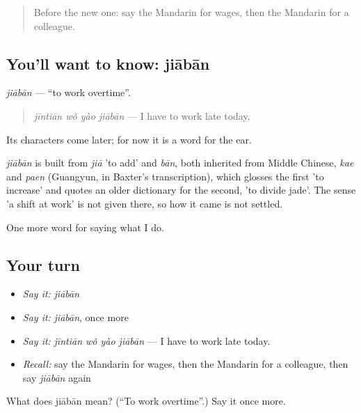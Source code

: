 \label{lesson:ZH-C255-jiaban}



\begin{quote}
Before the new one: say the Mandarin for wages, then the Mandarin for a colleague.
\end{quote}

\subsection*{You'll want to know: jiābān}
\emph{jiābān} — \textquotedblleft{}to work overtime\textquotedblright{}.

\begin{quote}
\emph{jīntiān wǒ yào jiābān} — I have to work late today.
\end{quote}

Its characters come later; for now it is a word for the ear.

\begin{cousinweb}
\emph{jiābān} is built from \emph{jiā} 'to add' and \emph{bān}, both inherited from Middle Chinese, \emph{kae} and \emph{paen} (Guangyun, in Baxter's transcription), which glosses the first 'to increase' and quotes an older dictionary for the second, 'to divide jade'. The sense 'a shift at work' is not given there, so how it came is not settled.
\end{cousinweb}

\begin{grammarlens}[title={What you've built}]
One more word for saying what I do.
\end{grammarlens}

\subsection*{Your turn}
\begin{itemize}
\raggedright
  \item \emph{Say it:} \emph{jiābān}
  \item \emph{Say it:} \emph{jiābān}, once more
  \item \emph{Say it:} \emph{jīntiān wǒ yào jiābān} — I have to work late today.
  \item \emph{Recall:} say the Mandarin for wages, then the Mandarin for a colleague, then say \emph{jiābān} again
\end{itemize}

\begin{tcolorbox}[breakable,colback=teal!4,colframe=teal!35!black,title={Before you move on}]
What does jiābān mean? (\textquotedblleft{}To work overtime\textquotedblright{}.) Say it once more.
\end{tcolorbox}
